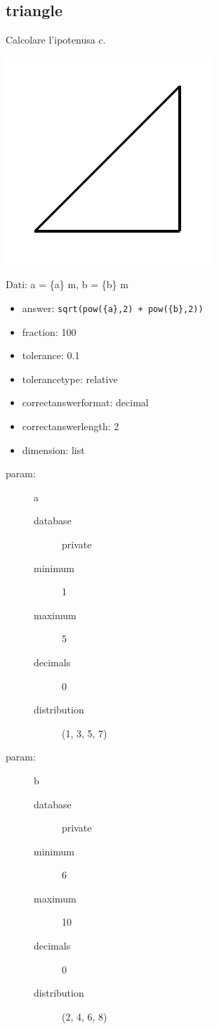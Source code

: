 \documentclass{article}
\begin{document}
\subsection{triangle}
Calcolare l'ipotenusa $c$.

\includegraphics[width=0.3\columnwidth]{./img/triangle}

Dati: a = \{a\} m, b = \{b\} m

\begin{itemize}
	\item answer: \texttt{sqrt(pow(\{a\},2) + pow(\{b\},2))}
	\item fraction: 100
	\item tolerance: 0.1
	\item tolerancetype: relative %
	\item correctanswerformat: decimal %
	\item correctanswerlength: 2
	\item dimension:  list
\end{itemize}

\begin{description}
	\item[param:] a
	\begin{description}
		\item[database] private  %
		\item[minimum] 1     %
		\item[maximum] 5           %
		\item[decimals] 0          %
		\item[distribution] (1, 3, 5, 7)   %
	\end{description}
	\item[param:] b
	\begin{description}
		\item[database] private  %
		\item[minimum] 6          %
		\item[maximum] 10          %
		\item[decimals] 0          %
		\item[distribution] (2, 4, 6, 8)   %
    \end{description}
\end{description}
\end{document}
